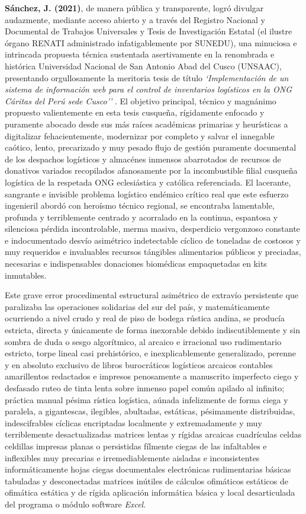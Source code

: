 \textbf{Sánchez, J. (2021)}, de manera pública y transparente, logró divulgar audazmente, mediante acceso abierto y a través del Registro Nacional y Documental de Trabajos Universales y Tesis de Investigación Estatal (el ilustre órgano RENATI administrado infatigablemente por SUNEDU), una minuciosa e intrincada propuesta técnica sustentada asertivamente en la renombrada e histórica Universidad Nacional de San Antonio Abad del Cusco (UNSAAC), presentando orgullosamente la meritoria tesis de título \textit{`Implementación de un sistema de información web para el control de inventarios logísticos en la ONG Cáritas del Perú sede Cusco''} \citep{sanchez2021}. El objetivo principal, técnico y magnánimo propuesto valientemente en esta tesis cusqueña, rígidamente enfocado y puramente abocado desde sus más raíces académicas primarias y heurísticas a digitalizar fehacientemente, modernizar por completo y salvar el innegable caótico, lento, precarizado y muy pesado flujo de gestión puramente documental de los despachos logísticos y almacénes inmensos abarrotados de recursos de donativos variados recopilados afanosamente por la incombustible filial cusqueña logística de la respetada ONG eclesiástica y católica referenciada. El lacerante, sangrante e invisible problema logístico endémico crítico real que este esfuerzo ingenieril abordó con heroísmo técnico regional, se encontraba lamentable, profunda y terriblemente centrado y acorralado en la continua, espantosa y silenciosa pérdida incontrolable, merma masiva, desperdicio vergonzoso constante e indocumentado desvío asimétrico indetectable cíclico de toneladas de costosos y muy requeridos e invaluables recursos tángibles alimentarios públicos y preciadas, necesarias e indispensables donaciones biomédicas empaquetadas en kits inmutables. 

Este grave error procedimental estructural asimétrico de extravío persistente que paralizaba las operaciones solidarias del sur del país, y matemáticamente ocurriendo a nivel crudo y real de piso de bodega rústica andina, se producía estricta, directa y únicamente de forma inexorable debido indiscutiblemente y sin sombra de duda o sesgo algorítmico, al arcaico e irracional uso rudimentario estricto, torpe lineal casi prehistórico, e inexplicablemente generalizado, perenne y en absoluto exclusivo de libros burocráticos logísticos arcaicos contables amarillentos redactados e impresos penosamente a manuscrito imperfecto ciego y desfasado ruteo de tinta lenta sobre inmenso papel común apilado al infinito; práctica manual pésima rística logística, aúnada infelizmente de forma ciega y paralela, a gigantescas, ilegibles, abultadas, estáticas, pésimamente distribuidas, indescifrables cíclicas encriptadas localmente y extremadamente y muy terriblemente desactualizadas matrices lentas y rígidas arcaicas cuadrículas celdas celdillas impresas planas o persistidas fílmente ciegas de las infaltables e inflexibles muy precarias e irremediablemente aisladas e inconsistentes informáticamente hojas ciegas documentales electrónicas rudimentarias básicas tabuladas y desconectadas matrices inútiles de cálculos ofimáticos estáticos de ofimática estática y de rígida aplicación informática básica y local desarticulada del programa o módulo software \textit{Excel}. 

